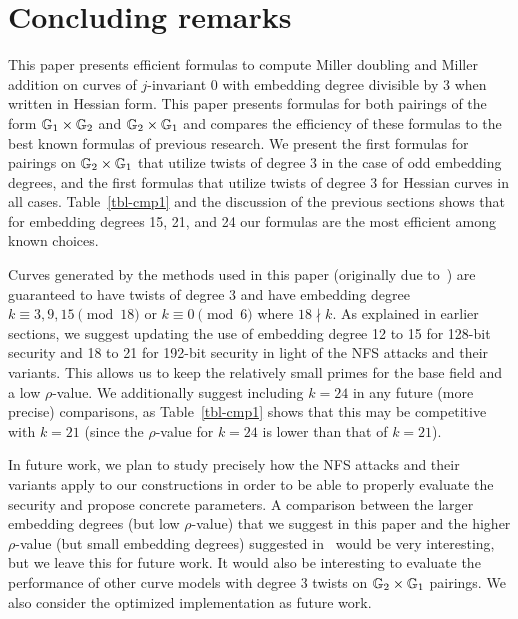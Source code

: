\section{Concluding remarks}
\label{sec:conclude}

This paper presents efficient formulas to compute Miller doubling and Miller addition on curves of $j$-invariant 0 with embedding degree divisible by 3 when written in Hessian form.
This paper presents formulas for both pairings of the form $\mathbb{G}_{1} \times \mathbb{G}_{2}$ and $\mathbb{G}_{2} \times \mathbb{G}_{1}$ and compares the efficiency of these formulas to the best known formulas of previous research.
We present the first formulas for pairings on $\mathbb{G}_{2} \times \mathbb{G}_{1}$ that utilize twists of degree 3 in the case of odd embedding degrees, and the first formulas that utilize twists of degree 3 for Hessian curves in all cases. 
Table~\ref{tbl-cmp1} and the discussion of the previous sections 
shows that for embedding degrees 15, 21, and 24
our formulas are the most efficient among known choices.

Curves generated by the methods used in this paper (originally due to~\cite{2010/freeman}) are guaranteed to have twists of degree $3$
and have embedding degree
$k \equiv 3,9,15 \pmod{18}$ or
$k \equiv 0 \pmod{6}$ where $18 \nmid k$.
As explained in earlier sections, we suggest updating the use of embedding degree 12 to 15 for 128-bit security and 18 to 21 for 192-bit security in light of the NFS attacks and their variants.
This allows us to keep the relatively small primes for the base field and a low $\rho$-value. 
We additionally suggest including $k=24$ in any future (more precise) comparisons, 
as Table~\ref{tbl-cmp1} shows that this may be competitive with $k=21$
(since the $\rho$-value for $k=24$ is lower than that of $k=21$).

In future work,
we plan to study precisely how the NFS attacks and their variants apply to our constructions in order to be able to
properly evaluate the security and propose concrete parameters.
A comparison between the larger embedding degrees (but low $\rho$-value) that we suggest
in this paper and the higher $\rho$-value (but small embedding degrees) suggested in~\cite{2018/FK} would be very interesting, but we leave this for future work.
It would also be interesting to evaluate the performance of other curve models with degree 3 twists on $\mathbb{G}_{2} \times \mathbb{G}_{1}$ pairings.
We also consider the optimized implementation as future work.


